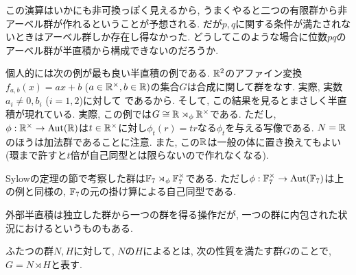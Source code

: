 \begin{prac}
この演算はいかにも非可換っぽく見えるから, うまくやると二つの有限群から非アーベル群が作れるということが予想される.  だが$p,q$に関する条件が満たされないときはアーベル群しか存在し得なかった. どうしてこのような場合に位数$pq$のアーベル群が半直積から構成できないのだろうか.
\end{prac}


\begin{eg} 個人的には次の例が最も良い半直積の例である. $\mathbb{R}^2$のアファイン変換$f_{a,b}(x) = ax+b$ ($a\in \mathbb{R}^{\times}, b\in \mathbb{R})$の集合$G$は合成に関して群をなす. 実際, 実数$a_i\neq 0,b_i$ ($i=1,2$)に対して
であるから. そして, この結果を見るとまさしく半直積が現れている. 実際, この例では$G\cong \mathbb{R}\rtimes_{\phi} \mathbb{R}^{\times}$である. ただし, $\phi:\mathbb{R}^{\times}\to \mathrm{Aut}(\mathbb{R})$は$t\in \mathbb{R}^{\times}$に対し$\phi_{t}(r) = tr$なる$\phi_t$を与える写像である. $N=\mathbb{R}$のほうは加法群であることに注意. また, この$\mathbb{R}$は一般の体に置き換えてもよい(環まで許すと$t$倍が自己同型とは限らないので作れなくなる).
\end{eg}

\begin{eg}
Sylowの定理の節で考察した群は$\mathbb{F}_{7}\rtimes_{\phi} \mathbb{F}_{7}^{\times}$である. ただし$\phi: \mathbb{F}_{7}^{\times} \to \mathrm{Aut}(\mathbb{F}_{7})$は上の例と同様の, $\mathbb{F}_{7}$の元の掛け算による自己同型である.
\end{eg}

外部半直積は独立した群から一つの群を得る操作だが, 一つの群に内包された状況におけるというものもある.
\begin{defn}
ふたつの群$N,H$に対して, $N$の$H$によるとは, 次の性質を満たす群$G$のことで, $G=N\rtimes H$と表す.
\end{defn}




